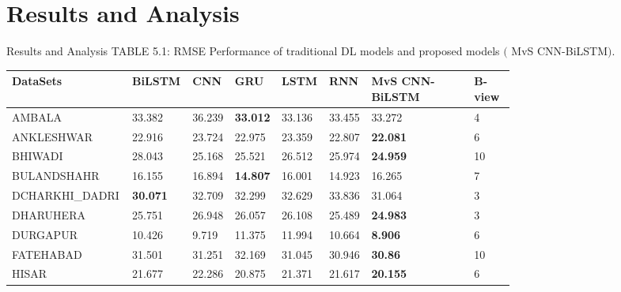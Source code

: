 \documentclass[12pt, aspectratio=169]{beamer}
\begin{document}
\section[Results and Analysis]{Results and Analysis}
\begin{frame}{Results and Analysis}
	\centering
	\scriptsize {TABLE 5.1: RMSE Performance of traditional DL models and proposed models $($ MvS CNN-BiLSTM$)$.}\\
	\begin{table}
		\begin{tabular}[c]{|p{0.165\linewidth}|p{0.096\linewidth}|p{0.044\linewidth}|p{0.044\linewidth}|p{0.06\linewidth}|p{0.044\linewidth}|p{0.206\linewidth}|p{0.08\linewidth}|} \hline
		\footnotesize \textbf{DataSets} &\footnotesize  \textbf{ BiLSTM } &\footnotesize  \textbf{CNN} &\footnotesize  \textbf{GRU} &\footnotesize  \textbf{LSTM } &\footnotesize  \textbf{RNN} & \footnotesize  \textbf{MvS CNN-BiLSTM } & \footnotesize  \textbf{B-view} \\ \hline
		AMBALA         & 33.382          & 36.239    & \textbf{33.012} & 33.136     & 33.455                & 33.272          & 4      \\ \hline
		ANKLESHWAR     & 22.916          & 23.724    & 22.975          & 23.359     & 22.807                & \textbf{22.081} & 6      \\ \hline
		BHIWADI        & 28.043          & 25.168    & 25.521          & 26.512     & 25.974                & \textbf{24.959} & 10     \\ \hline
		BULANDSHAHR    & 16.155          & 16.894    & \textbf{14.807} & 16.001     & 14.923                & 16.265          & 7      \\ \hline
		 DCHARKHI\_DADRI & \textbf{30.071} & 32.709    & 32.299          & 32.629     & 33.836              & 31.064          & 3      \\ \hline
		 DHARUHERA      & 25.751          & 26.948    & 26.057          & 26.108     & 25.489           &\textbf{24.983}          & 3      \\ \hline
		 DURGAPUR       & 10.426          & 9.719     & 11.375          & 11.994     & 10.664                    & \textbf{8.906}  & 6      \\ \hline
		 FATEHABAD      & 31.501          & 31.251    & 32.169          & 31.045     & 30.946                    & \textbf{30.86}  & 10     \\ \hline
		 HISAR          & 21.677          & 22.286    & 20.875          & 21.371     & 21.617                 & \textbf{20.155} & 6      \\ \hline

\end{tabular}
\end{table}
\end{frame}
\end{document}
